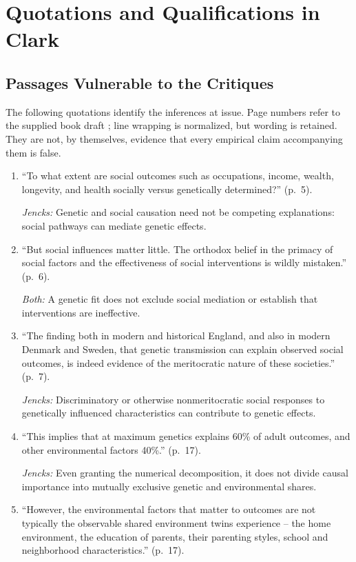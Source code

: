 \section{Quotations and Qualifications in Clark}\label{app:quotations}
\subsection{Passages Vulnerable to the Critiques}

The following quotations identify the inferences at issue. Page numbers
refer to the supplied book draft \citep{Clark2026}; line wrapping is
normalized, but wording is retained. They are not, by themselves, evidence
that every empirical claim accompanying them is false.

\begin{enumerate}[label=\arabic*.]
\item ``To what extent are social outcomes such as occupations, income, wealth, longevity, and health socially versus genetically determined?'' (p.~5).

\emph{Jencks:} Genetic and social causation need not be competing explanations: social pathways can mediate genetic effects.

\item ``But social influences matter little. The orthodox belief in the primacy of social factors and the effectiveness of social interventions is wildly mistaken.'' (p.~6).

\emph{Both:} A genetic fit does not exclude social mediation or establish that interventions are ineffective.

\item ``The finding both in modern and historical England, and also in modern Denmark and Sweden, that genetic transmission can explain observed social outcomes, is indeed evidence of the meritocratic nature of these societies.'' (p.~7).

\emph{Jencks:} Discriminatory or otherwise nonmeritocratic social responses to genetically influenced characteristics can contribute to genetic effects.

\item ``This implies that at maximum genetics explains 60\% of adult outcomes, and other environmental factors 40\%.'' (p.~17).

\emph{Jencks:} Even granting the numerical decomposition, it does not divide causal importance into mutually exclusive genetic and environmental shares.

\item ``However, the environmental factors that matter to outcomes are not typically the observable shared environment twins experience -- the home environment, the education of parents, their parenting styles, school and neighborhood characteristics.'' (p.~17).


\end{enumerate}
